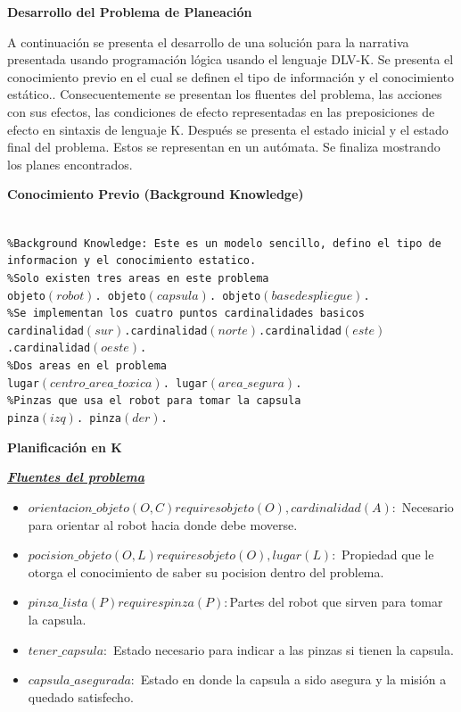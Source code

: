 \documentclass[letterpaper ,10pt]{article}
\begin{document}
{{\centerline {\Huge\sffamily\textbf{ Desarrollo del Problema de Planeación  }}
\vspace{0.5cm}
\noindent A continuación se presenta el desarrollo de una solución para la narrativa presentada usando programación lógica usando el lenguaje DLV-K. Se presenta el conocimiento previo en el cual se definen el tipo de información y el conocimiento estático.. Consecuentemente se presentan los fluentes del problema, las acciones con sus efectos, las condiciones de efecto representadas en las preposiciones de efecto en sintaxis de lenguaje K. Después se presenta el estado inicial y el estado final del problema. Estos se representan en un autómata. Se finaliza mostrando los planes encontrados.\\
\medskip

{\centerline
{\LARGE \textbf{ Conocimiento Previo (Background Knowledge)}}
}

{\small\texttt{\\
\%Background Knowledge: Este es un modelo sencillo, defino el tipo de informacion y el conocimiento estatico.\\
\%Solo existen tres areas en este problema\\
objeto$(robot)$. objeto$(capsula)$. objeto$(basedespliegue)$.\\
\%Se implementan los cuatro puntos cardinalidades basicos\\
cardinalidad$(sur)$.cardinalidad$(norte)$.cardinalidad$(este)$.cardinalidad$(oeste)$.\\
\%Dos areas en el problema\\
lugar$(centro\_area\_toxica)$. lugar$(area\_segura)$.\\
\%Pinzas que usa el robot para tomar la capsula\\
pinza$(izq)$. pinza$(der)$.\\
 } }

{\centerline
{\LARGE \textbf{ Planificación en K}}
}
\textbf{\noindent \ul{\textsl{Fluentes del problema} }}
\begin{itemize}
\item $orientacion\_objeto(O, C) requires objeto(O), cardinalidad(A):$ Necesario para orientar al robot hacia donde debe moverse.
\item $pocision\_objeto(O, L) requires objeto(O), lugar(L): $ Propiedad que le otorga el conocimiento de saber su pocision dentro del problema.
\item $pinza\_lista(P) requires pinza(P): $Partes del robot que sirven para tomar la capsula.
\item $tener\_capsula:$ Estado necesario para indicar a las pinzas si tienen la capsula.
\item $capsula\_asegurada:$ Estado en donde la capsula a sido asegura y la misión a quedado satisfecho.
\end{itemize}
\vspace{1.8cm}

}}
\end{document}
